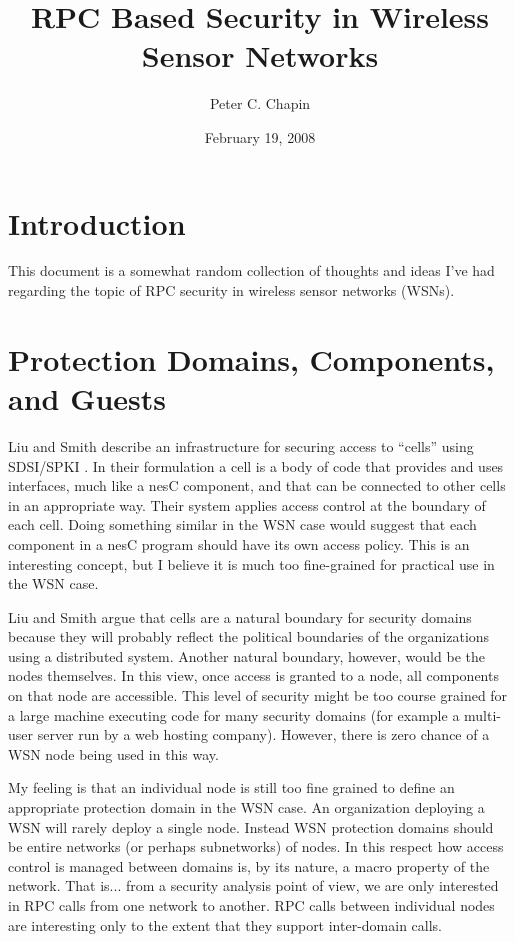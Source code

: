 \documentclass{article}
\begin{document}
\title{RPC Based Security in Wireless Sensor Networks}
\author{Peter C. Chapin}
\date{February 19, 2008}
\maketitle

\section{Introduction}

This document is a somewhat random collection of thoughts and ideas I've had regarding the topic
of RPC security in wireless sensor networks (WSNs).

\section{Protection Domains, Components, and Guests}

Liu and Smith describe an infrastructure for securing access to ``cells'' using SDSI/SPKI
\cite{liu-smith-component-security-2002}. In their formulation a cell is a body of code that
provides and uses interfaces, much like a nesC component, and that can be connected to other
cells in an appropriate way. Their system applies access control at the boundary of each cell.
Doing something similar in the WSN case would suggest that each component in a nesC program
should have its own access policy. This is an interesting concept, but I believe it is much too
fine-grained for practical use in the WSN case.

Liu and Smith argue that cells are a natural boundary for security domains because they will
probably reflect the political boundaries of the organizations using a distributed system.
Another natural boundary, however, would be the nodes themselves. In this view, once access is
granted to a node, all components on that node are accessible. This level of security might be
too course grained for a large machine executing code for many security domains (for example a
multi-user server run by a web hosting company). However, there is zero chance of a WSN node
being used in this way.

My feeling is that an individual node is still too fine grained to define an appropriate
protection domain in the WSN case. An organization deploying a WSN will rarely deploy a single
node. Instead WSN protection domains should be entire networks (or perhaps subnetworks) of
nodes. In this respect how access control is managed between domains is, by its nature, a macro
property of the network. That is... from a security analysis point of view, we are only
interested in RPC calls from one network to another. RPC calls between individual nodes are
interesting only to the extent that they support inter-domain calls.
\end{document}
